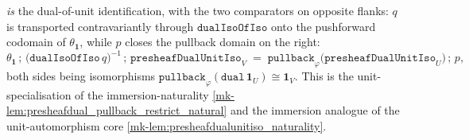 \begin{lemma}
  \emph{is} the dual-of-unit identification, with the two comparators on opposite flanks: \(q\) is
  transported contravariantly through \(\mathtt{dualIsoOfIso}\) onto the pushforward codomain of
  \(\theta_{\mathbf 1}\), while \(p\) closes the pullback domain on the right:
  \[
    \theta_{\mathbf 1}
      \,\mathbin{;}\, \bigl(\mathtt{dualIsoOfIso}\,q\bigr)^{-1}
      \,\mathbin{;}\, \mathtt{presheafDualUnitIso}_V
    \;=\; \mathtt{pullback}_\varphi\bigl(\mathtt{presheafDualUnitIso}_U\bigr)
      \,\mathbin{;}\, p,
  \]
  both sides being isomorphisms
  \(\mathtt{pullback}_\varphi(\mathtt{dual}\,\mathbf 1_U) \cong \mathbf 1_V\). This is the
  unit-specialisation of the immersion-naturality \ref{mk-lem:presheafdual_pullback_restrict_natural}
  and the immersion analogue of the unit-automorphism core
  \ref{mk-lem:presheafdualunitiso_naturality}.
\end{lemma}
